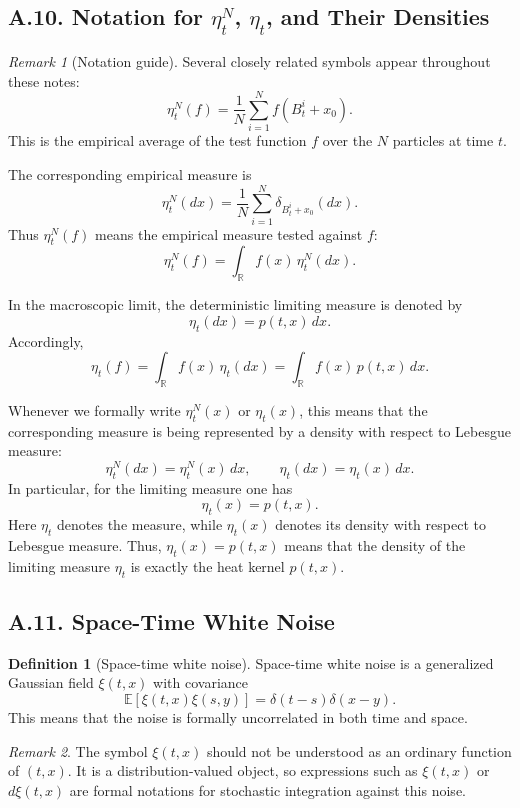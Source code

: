\documentclass[11pt]{article}
\theoremstyle{definition}
\newtheorem{definition}{Definition}
\theoremstyle{remark}
\newtheorem{remark}{Remark}
\begin{document}
\subsection*{A.10. Notation for $\eta_t^N$, $\eta_t$, and Their Densities}
\begin{remark}[Notation guide]
Several closely related symbols appear throughout these notes:
\[
\eta_t^N(f)=\frac{1}{N}\sum_{i=1}^N f(B_t^i+x_0).
\]
This is the empirical average of the test function $f$ over the $N$ particles at time $t$.

The corresponding empirical measure is
\[
\eta_t^N(dx)=\frac{1}{N}\sum_{i=1}^N \delta_{B_t^i+x_0}(dx).
\]
Thus $\eta_t^N(f)$ means the empirical measure tested against $f$:
\[
\eta_t^N(f)=\int_{\mathbb R} f(x)\,\eta_t^N(dx).
\]

In the macroscopic limit, the deterministic limiting measure is denoted by
\[
\eta_t(dx)=p(t,x)\,dx.
\]
Accordingly,
\[
\eta_t(f)=\int_{\mathbb R} f(x)\,\eta_t(dx)=\int_{\mathbb R} f(x)\,p(t,x)\,dx.
\]

Whenever we formally write $\eta_t^N(x)$ or $\eta_t(x)$, this means that the corresponding measure is being represented by a density with respect to Lebesgue measure:
\[
\eta_t^N(dx)=\eta_t^N(x)\,dx,
\qquad
\eta_t(dx)=\eta_t(x)\,dx.
\]
In particular, for the limiting measure one has
\[
\eta_t(x)=p(t,x).
\]
Here $\eta_t$ denotes the measure, while $\eta_t(x)$ denotes its density with respect to Lebesgue measure.
Thus, $\eta_t(x)=p(t,x)$ means that the density of the limiting measure $\eta_t$ is exactly the heat kernel $p(t,x)$.
\end{remark}

\subsection*{A.11. Space-Time White Noise}
\begin{definition}[Space-time white noise]
Space-time white noise is a generalized Gaussian field $\xi(t,x)$ with covariance
\[
\mathbb E[\xi(t,x)\xi(s,y)]=\delta(t-s)\delta(x-y).
\]
This means that the noise is formally uncorrelated in both time and space.
\end{definition}

\begin{remark}
The symbol $\xi(t,x)$ should not be understood as an ordinary function of $(t,x)$. It is a distribution-valued object, so expressions such as $\xi(t,x)$ or $d\xi(t,x)$ are formal notations for stochastic integration against this noise.
\end{remark}
\end{document}
